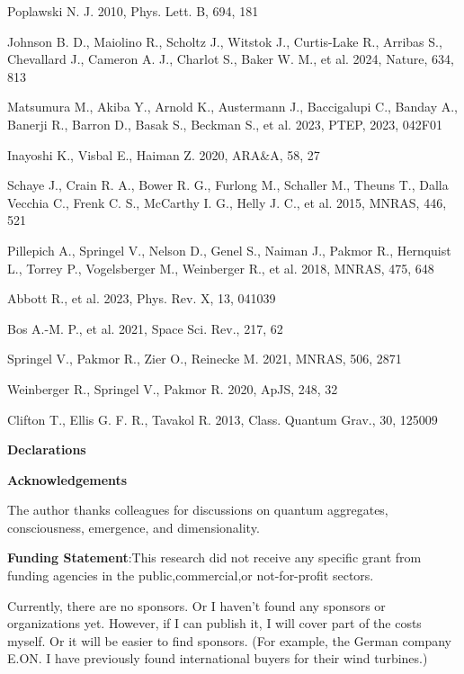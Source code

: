 \documentclass[a4paper,11pt]{article}
\begin{document}
\begin{thebibliography}{}
 Poplawski N. J. 2010, Phys. Lett. B, 694, 181

 Johnson B. D., Maiolino R., Scholtz J., Witstok J., Curtis-Lake R., Arribas S., Chevallard J., Cameron A. J., Charlot S., Baker W. M., et al. 2024, Nature, 634, 813

 Matsumura M., Akiba Y., Arnold K., Austermann J., Baccigalupi C., Banday A., Banerji R., Barron D., Basak S., Beckman S., et al. 2023, PTEP, 2023, 042F01

 Inayoshi K., Visbal E., Haiman Z. 2020, ARA\&A, 58, 27

 Schaye J., Crain R. A., Bower R. G., Furlong M., Schaller M., Theuns T., Dalla Vecchia C., Frenk C. S., McCarthy I. G., Helly J. C., et al. 2015, MNRAS, 446, 521

 Pillepich A., Springel V., Nelson D., Genel S., Naiman J., Pakmor R., Hernquist L., Torrey P., Vogelsberger M., Weinberger R., et al. 2018, MNRAS, 475, 648

 Abbott R., et al. 2023, Phys. Rev. X, 13, 041039

 Bos A.-M. P., et al. 2021, Space Sci. Rev., 217, 62

 Springel V., Pakmor R., Zier O., Reinecke M. 2021, MNRAS, 506, 2871

 Weinberger R., Springel V., Pakmor R. 2020, ApJS, 248, 32

 Clifton T., Ellis G. F. R., Tavakol R. 2013, Class. Quantum Grav., 30, 125009

\end{thebibliography}
\textbf{\textbf{Declarations}}

  \textbf{\textbf{Acknowledgements}}

The author thanks colleagues for discussions on quantum aggregates, consciousness, emergence, and dimensionality. 

 \textbf{\textbf{Funding Statement}}:This research did not receive any specific grant from funding agencies in the public,commercial,or not-for-profit sectors.

Currently, there are no sponsors. Or I haven't found any sponsors or organizations yet. However, if I can publish it, I will cover part of the costs myself. Or it will be easier to find sponsors. (For example, the German company E.ON. I have previously found international buyers for their wind turbines.)
\end{document}
